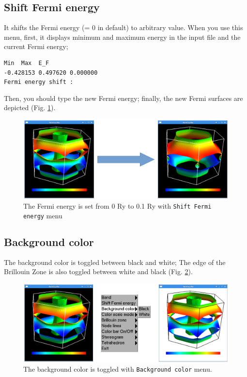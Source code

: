 \documentclass[12pt]{article}
\begin{document}
\subsection{Shift Fermi energy}

It shifts the Fermi energy (= 0 in default) to arbitrary value.
When you use this menu, 
first, it displays minimum and maximum energy in the input file
and the current Fermi energy;
\begin{verbatim}
Min  Max  E_F 
-0.428153 0.497620 0.000000 
Fermi energy shift : 
\end{verbatim}
Then, you should type the new Fermi energy;
finally, the new Fermi surfaces are depicted (Fig. \ref{fig_shift}).

\begin{figure}[!ht]
  \includegraphics[width=17cm]{figs/shift.eps}
  \caption{The Fermi energy is set from 0 Ry to 0.1 Ry 
    with \texttt{Shift Fermi energy} menu}
  \label{fig_shift}
\end{figure}

\newpage

\subsection{Background color}

The background color is toggled between black and white;
The edge of the Brillouin Zone is also toggled 
between white and black (Fig. \ref{fig_background}). 

\begin{figure}[!ht]
  \includegraphics[width=17cm]{figs/background.eps}
  \caption{The background color is toggled with \texttt{Background color} menu.}
  \label{fig_background}
\end{figure}
\end{document}
